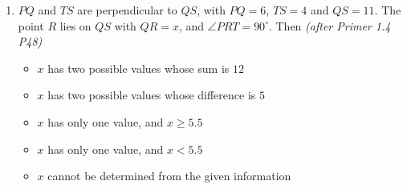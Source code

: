 \documentclass[11pt,a4paper]{article}
\begin{document}
\begin{enumerate}
\item \begin{minipage}[t]{0.58\linewidth}
$PQ$ and $TS$ are perpendicular to $QS$, with $PQ=6$, $TS=4$ and $QS=11$. The point $R$ lies on $QS$ with $QR=x$, and $\angle PRT=90^\circ$. Then \textit{\small(after Primer 1.4 P48)}
\begin{itemize}
\item[A)] $x$ has two possible values whose sum is $12$
\item[B)] $x$ has two possible values whose difference is $5$
\item[C)] $x$ has only one value, and $x\geq 5.5$
\item[D)] $x$ has only one value, and $x<5.5$
\item[E)] $x$ cannot be determined from the given information
\end{itemize}
\end{minipage}\hfill
\begin{minipage}[t]{0.38\linewidth}
\vspace{0pt}
\centering
{}
\end{minipage}


\end{enumerate}
\end{document}
